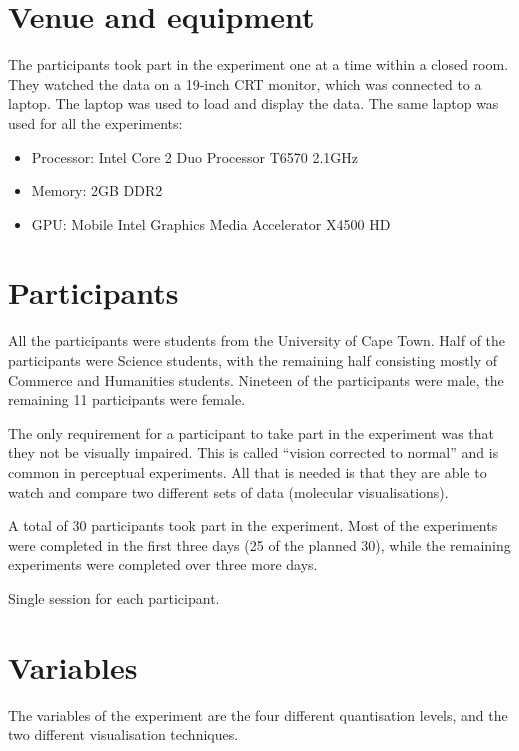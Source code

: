 \section{Venue and equipment}
\label{sec:experiment_venue}

The participants took part in the experiment one at a time within a closed
room. They watched the data on a 19-inch CRT monitor, which was connected to a
laptop. The laptop was used to load and display the data. The same laptop was
used for all the experiments: \begin{itemize} \item Processor: Intel Core 2 Duo
Processor T6570 2.1GHz \item Memory: 2GB DDR2 \item GPU: Mobile Intel Graphics
Media Accelerator X4500 HD \end{itemize}


\section{Participants}
\label{sec:experiment_participants}

All the participants were students from the University of Cape Town. Half of
the participants were Science students, with the remaining half consisting
mostly of Commerce and Humanities students. Nineteen of the participants were
male, the remaining 11 participants were female.

The only requirement for a participant to take part in the experiment was that
they not be visually impaired. This is called ``vision corrected to normal''
and is common in perceptual experiments. All that is needed is that they are
able to watch and compare two different sets of data (molecular
visualisations).

A total of 30 participants took part in the experiment. Most of the experiments
were completed in the first three days (25 of the planned 30), while the
remaining experiments were completed over three more days.

Single session for each participant.


\section{Variables}
\label{sec:experiment_variables}

The variables of the experiment are the four different quantisation levels, and
the two different visualisation techniques.

